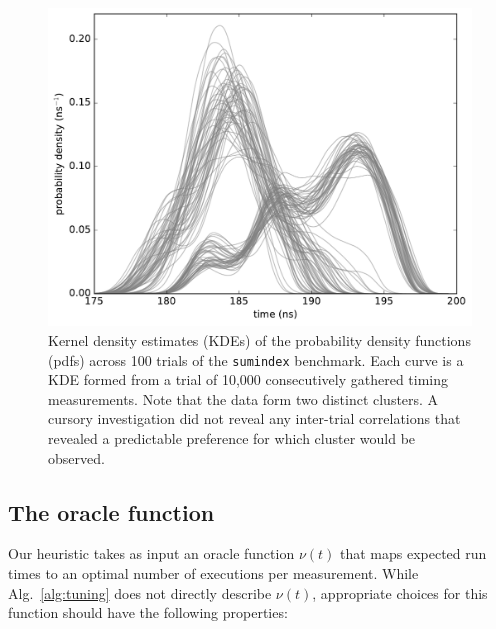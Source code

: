 \documentclass[conference]{IEEEtran}
\begin{document}
\begin{figure}
\centering
\includegraphics[width=\columnwidth]{figures/fig4/kde_pdf_sumindex}
\caption{Kernel density estimates (KDEs) of the probability density functions
(pdfs) across 100 trials of the \lstinline|sumindex| benchmark. Each curve is a
KDE formed from a trial of 10,000 consecutively gathered timing measurements.
Note that the data form two distinct clusters. A cursory investigation did not
reveal any inter-trial correlations that revealed a predictable preference for
which cluster would be observed.}
\label{fig:pdfsumindex}
\end{figure}

\subsection{The oracle function}
\label{sec:oracle}

Our heuristic takes as input an oracle function $\nu(t)$ that maps expected
run times to an optimal number of executions per measurement. While
Alg.~\ref{alg:tuning} does not directly describe $\nu(t)$, appropriate choices
for this function should have the following properties:
\end{document}

